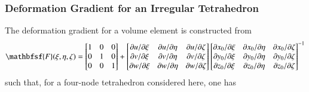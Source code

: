 \subsubsection{Deformation Gradient for an Irregular Tetrahedron}

The deformation gradient for a volume element is constructed from
\begin{equation}
    \mathbfsf{F} ( \xi , \eta , \zeta ) = \begin{bmatrix} 1 & 0 & 0 \\
    0 & 1 & 0 \\ 0 & 0 & 1 \end{bmatrix} + \begin{bmatrix}
    \partial u / \partial \xi & \partial u / \partial \eta & \partial u / \partial \zeta \\
    \partial v / \partial \xi & \partial v / \partial \eta & \partial v / \partial \zeta \\
    \partial w / \partial \xi & \partial w / \partial \eta & \partial w / \partial \zeta
    \end{bmatrix} \begin{bmatrix}
    \partial x_0 / \partial \xi & \partial x_0 / \partial \eta & \partial x_0 / \partial \zeta \\
    \partial y_0 / \partial \xi & \partial y_0 / \partial \eta & \partial y_0 / \partial \zeta \\
    \partial z_0 / \partial \xi & \partial z_0 / \partial \eta & \partial z_0 / \partial \zeta
    \end{bmatrix}^{-1}
\end{equation}
such that, for a four-node tetrahedron considered here, one has
